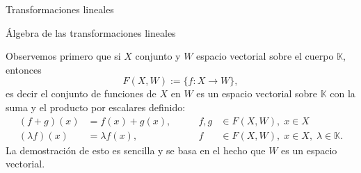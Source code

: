 \documentclass[a4paper,12pt,twoside,spanish,reqno]{amsbook}
\theoremstyle{definition}
\theoremstyle{remark}
\newcommand{\K}{\mathbb K}
\begin{document}
\begin{chapter}{Transformaciones lineales}
\begin{section}{Álgebra de las transformaciones lineales}
            
            Observemos primero que si $X$ conjunto y $W$ espacio vectorial sobre el cuerpo $\K$,  entonces
            $$
            F(X,W) := \{f:X\to W\},
            $$ 
            es decir el conjunto de funciones de $X$ en $W$ es un espacio vectorial sobre $\K$ con la suma y el producto por escalares definido:
            \begin{equation*}
            \begin{array}{rlcl}
            (f+g)(x) &= f(x)+ g(x),\qquad &f,g& \in F(X,W),\; x \in X\\
            (\lambda f)(x) &= \lambda f(x), & f& \in F(X,W),\; x \in X, \; \lambda \in \K.
            \end{array}
            \end{equation*}
            La demostración de esto es sencilla y se basa en el hecho que $W$  es un espacio vectorial. 
            

\end{section}
\end{chapter}
\end{document}
